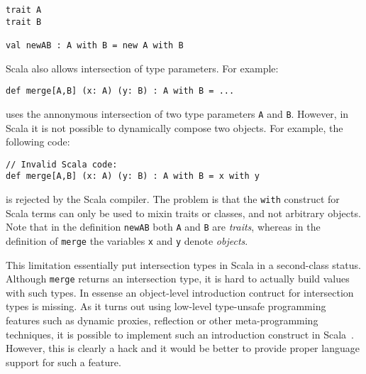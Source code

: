 \begin{lstlisting}
trait A
trait B

val newAB : A with B = new A with B
\end{lstlisting}

\noindent Scala also allows intersection of type parameters. For example:
\begin{lstlisting}
def merge[A,B] (x: A) (y: B) : A with B = ...
\end{lstlisting}
uses the annonymous intersection of two type parameters \lstinline{A} and
\lstinline{B}. However, in Scala it is not possible to dynamically
compose two objects. For example, the following code:

\begin{lstlisting}
// Invalid Scala code:
def merge[A,B] (x: A) (y: B) : A with B = x with y
\end{lstlisting}

\noindent is rejected by the Scala compiler. The problem is that the
\lstinline{with} construct for Scala terms can only be used to
mixin traits or classes, and not arbitrary objects. Note that in the
definition \lstinline{newAB} both \lstinline{A} and \lstinline{B} are
\emph{traits}, whereas in the definition of \lstinline{merge} the variables
\lstinline{x} and \lstinline{y} denote \emph{objects}.

\begin{comment}
A common limitation in those languages, though, is that there is no introduction
construct at the term level for intersection types. In Java and Scala, we cannot
create an instance of class type \lstinline{A & B} with
\begin{lstlisting}
  new A() & B()
\end{lstlisting}
\end{comment}

This limitation essentially put intersection types in Scala in a second-class
status. Although \lstinline{merge} returns an intersection type, it is
hard to actually build values with such types. In essense an
object-level introduction contruct for intersection types is missing.
As it turns out using low-level type-unsafe programming features such
as dynamic proxies, reflection or other meta-programming techniques,
it is possible to implement such an introduction
construct in Scala~\cite{oliveira2013feature,rendel14attributes}. However, this
is clearly a hack and it would be better to provide proper language
support for such a feature.

\begin{comment}
This is in
contrast, there are term-level introduction construct for function types (with
lambdas) and universal quantification (with big lambdas) in most core
calculi.
\end{comment}

